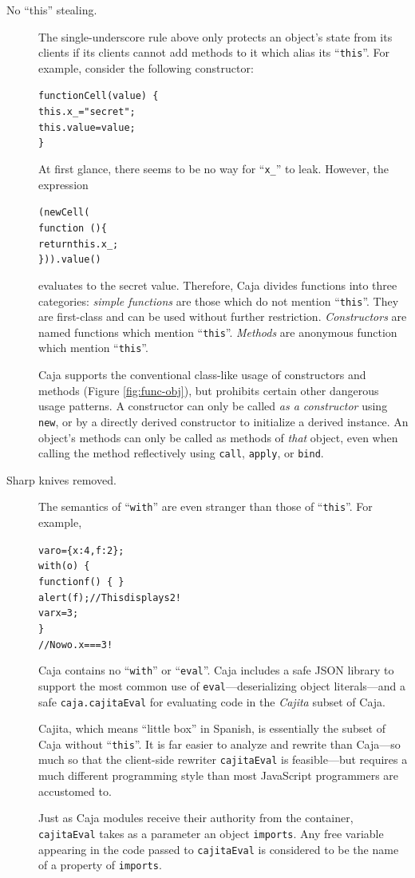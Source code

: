 \documentclass[letterpaper,twocolumn,10pt]{article}
\newcommand{\code}[1]{{\tt {#1}}}              %
\begin{document}
\begin{description}
  \item[No ``this'' stealing.]  
  The single-underscore rule above only protects 
  an object's state from its clients if its clients cannot add methods to it 
  which alias its ``\code{this}''.  For example, consider the following
  constructor:
\begin{alltt}
function Cell(value)\ \{
  this.x_ = "secret";
  this.value = value;
\}
\end{alltt}
  At first glance, there seems to be no way for ``\code{x\_}'' to leak.
  However, the expression
\begin{alltt}
(new Cell( 
    function\ ()\{ 
      return this.x_; 
    \})).value()
\end{alltt}
  evaluates to the secret value.  Therefore, Caja divides functions into three 
  categories: \emph{simple functions} are those which do not mention 
  ``\code{this}''. They are first-class and can be used without further 
  restriction. \emph{Constructors} are named functions which mention 
  ``\code{this}''. \emph{Methods} are anonymous function which mention 
  ``\code{this}''.
  
  Caja supports the conventional class-like usage of constructors and methods 
  (Figure \ref{fig:func-obj}), but 
  prohibits certain other dangerous usage patterns. A constructor can only be 
  called \emph{as a constructor} using \code{new}, or by a directly derived 
  constructor to initialize a derived instance. An object's methods can only 
  be called as methods of \emph{that} object, even when calling the method 
  reflectively using \code{call}, \code{apply}, or \code{bind}.
 
  \item[Sharp knives removed.] The semantics of ``\code{with}'' are even
  stranger than those of ``\code{this}''.  For example,
\begin{alltt}
var o = \{ x: 4, f: 2 \};
with(o)\ \{
  function f()\ \{\ \}
  alert(f); // This displays 2 !
  var x = 3;
\}
// Now o.x === 3 !
\end{alltt}
   Caja contains no ``\code{with}'' or 
  ``\code{eval}''. Caja includes a safe JSON library to support the most 
  common use of \code{eval}---deserializing object literals---and a safe 
  \code{caja.cajitaEval} for evaluating code in the \emph{Cajita} subset 
  of Caja. 
  
  Cajita, which means ``little box'' in Spanish, is essentially 
  the subset of Caja without ``\code{this}''.  It is far easier to analyze
  and rewrite than Caja---so much so that the client-side rewriter \code{cajitaEval} is
  feasible---but requires a much different programming style than
  most JavaScript programmers are accustomed to.
  
  Just as Caja modules receive their authority from the container,
  \code{cajitaEval} takes as a parameter an object \code{imports}.
  Any free variable appearing in the code passed to \code{cajitaEval}
  is considered to be the name of a property of \code{imports}.
\end{description}
\end{document}
